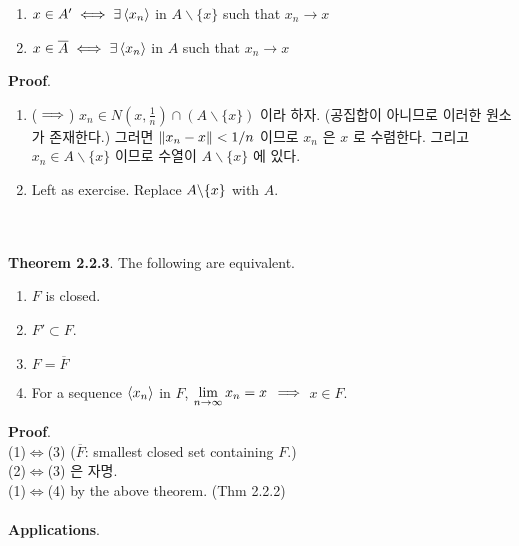 \begin{enumerate}
	\item $x\in A' \iff \exists \left\langle x_n \right\rangle$ in $A\backslash \{x\}$ such that $x_n\rightarrow x$
	\item $x\in \overline{A} \iff \exists \left\langle x_n \right\rangle$ in $A$ such that $x_n\rightarrow x$ 
\end{enumerate}
\textbf{Proof}.
\begin{enumerate}
	\item ($\implies$) $x_n\in N\left(x, \frac{1}{n} \right) \cap (A\backslash \{x\})$ 이라 하자. (공집합이 아니므로 이러한 원소가 존재한다.) 그러면 $\left\lVert x_n-x\right\rVert<1/n$ 이므로 $x_n$ 은 $x$ 로 수렴한다. 그리고 $x_n\in A\backslash\{x\}$ 이므로 수열이 $A\backslash\{x\}$ 에 있다.
	\item Left as exercise. Replace $A\backslash \{x\} $ with $A$.
\end{enumerate}~\\
\\
\textbf{Theorem 2.2.3}. The following are equivalent.
\begin{enumerate}
	\item $F$ is closed.
	\item $F'\subset F$.
	\item $F =\overline{F}$
	\item For a sequence $\left\langle x_n \right\rangle$ in $F$, $\displaystyle\lim_{n\rightarrow \infty} x_n = x$ $\implies$ $x\in F$.
\end{enumerate}
\textbf{Proof}. \\
(1)$\iff$(3) ($\overline{F}$: smallest closed set containing $F$.)\\
(2)$\iff$(3) 은 자명.\\
(1)$\iff$(4) by the above theorem. (Thm 2.2.2)\\
\\
\textbf{Applications}.
